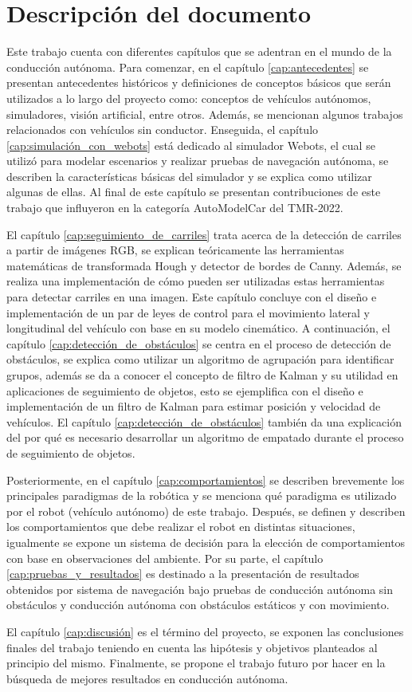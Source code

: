 \section{Descripción del documento}

Este trabajo cuenta con diferentes capítulos que se adentran en el mundo de la conducción autónoma. Para comenzar, en el capítulo \ref{cap:antecedentes} se presentan antecedentes históricos y definiciones de conceptos básicos que serán utilizados a lo largo del proyecto como: conceptos de vehículos autónomos, simuladores, visión artificial, entre otros. Además, se mencionan algunos trabajos relacionados con vehículos sin conductor. Enseguida, el capítulo \ref{cap:simulación_con_webots} está dedicado al simulador Webots, el cual se utilizó para modelar escenarios y realizar pruebas de navegación autónoma, se describen la características básicas del simulador y se explica como utilizar algunas de ellas. Al final de este capítulo se presentan contribuciones de este trabajo que influyeron en la categoría AutoModelCar del TMR-2022.

El capítulo \ref{cap:seguimiento_de_carriles} trata acerca de la detección de carriles a partir de imágenes RGB, se explican teóricamente las herramientas matemáticas de transformada Hough y detector de bordes de Canny. Además, se realiza una implementación de cómo pueden ser utilizadas estas herramientas para detectar carriles en una imagen. Este capítulo concluye con el diseño e implementación de un par de leyes de control para el movimiento lateral y longitudinal del vehículo con base en su modelo cinemático. A continuación, el capítulo \ref{cap:detección_de_obstáculos} se centra en el proceso de detección de obstáculos, se explica como utilizar un algoritmo de agrupación para identificar grupos, además se da a conocer el concepto de filtro de Kalman y su utilidad en aplicaciones de seguimiento de objetos, esto se ejemplifica con el diseño e implementación de un filtro de Kalman para estimar posición y velocidad de vehículos. El capítulo \ref{cap:detección_de_obstáculos} también da una explicación del por qué es necesario desarrollar un algoritmo de empatado durante el proceso de seguimiento de objetos.

Posteriormente, en el capítulo \ref{cap:comportamientos} se describen brevemente los principales paradigmas de la robótica y se menciona qué paradigma es utilizado por el robot (vehículo autónomo) de este trabajo. Después, se definen y describen los comportamientos que debe realizar el robot en distintas situaciones, igualmente se expone un sistema de decisión para la elección de comportamientos con base en observaciones del ambiente. Por su parte, el capítulo \ref{cap:pruebas_y_resultados} es destinado a la presentación de resultados obtenidos por sistema de navegación bajo pruebas de conducción autónoma sin obstáculos y conducción autónoma con obstáculos estáticos y con movimiento.

El capítulo \ref{cap:discusión} es el término del proyecto, se exponen las conclusiones finales del trabajo teniendo en cuenta las hipótesis y objetivos planteados al principio del mismo. Finalmente, se propone el trabajo futuro por hacer en la búsqueda de mejores resultados en conducción autónoma.

